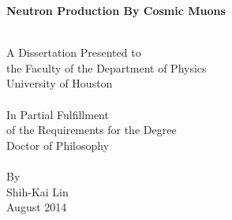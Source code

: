 \begin{titlepage}
\begin{center}



\begin{description}
\bigskip
\bigskip
\bigskip
\bigskip
\bigskip
\end{description}

{ \huge \bfseries Neutron Production By Cosmic Muons \\[0.4cm] }

\HRule \\[1.0cm]

A Dissertation Presented to\\
the Faculty of the Department of Physics\\
University of Houston\\[1.0cm]

\HRule \\[1.0cm]

In Partial Fulfillment\\
of the Requirements for the Degree\\
Doctor of Philosophy\\[1.0cm]

\HRule \\[1.0cm]

By\\
Shih-Kai Lin\\
August 2014




\end{center}
\end{titlepage}
